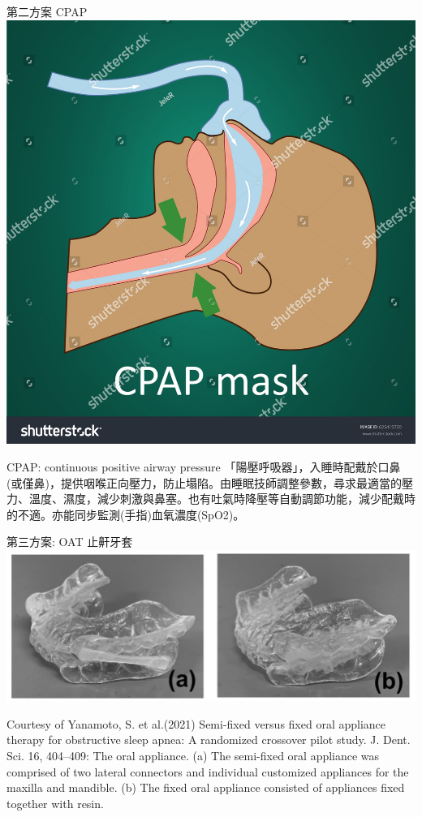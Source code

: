 \documentclass[aspectratio=169]{beamer}
\begin{document}
\begin{frame}{第二方案 CPAP}
    \centering
    \includegraphics[height=0.30\textwidth]{stock-vector-vector-illustration-of-normal-breathing-with-cpap-mask-625415720.jpg}
    
    \begin{block}{CPAP: continuous positive airway pressure}
    「陽壓呼吸器」，入睡時配戴於口鼻(或僅鼻)，提供咽喉正向壓力，防止塌陷。由睡眠技師調整參數，尋求最適當的壓力、溫度、濕度，減少刺激與鼻塞。也有吐氣時降壓等自動調節功能，減少配戴時的不適。亦能同步監測(手指)血氧濃度(SpO2)。
    \end{block}

\end{frame}

\begin{frame}{第三方案: OAT 止鼾牙套}
\centering
\includegraphics[height=0.30\textwidth]{Yanamoto2021.jpg}
\par Courtesy of Yanamoto, S. et al.(2021) Semi-fixed versus fixed oral appliance therapy for obstructive sleep apnea: A randomized crossover pilot study. J. Dent. Sci. 16, 404–409: The oral appliance. (a) The semi-fixed oral appliance was comprised of two lateral connectors and individual customized appliances for the maxilla and mandible. (b) The fixed oral appliance consisted of appliances fixed together with resin.

\end{frame}
\end{document}
